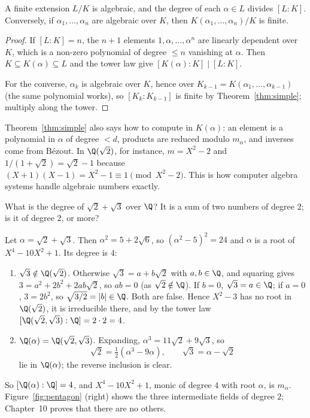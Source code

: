 \begin{corollary}\label{cor:finitealg}
A finite extension $L/K$ is algebraic, and the degree of each $\alpha\in L$ divides $[L:K]$. Conversely, if $\alpha_1,\dots,\alpha_n$ are algebraic over $K$, then $K(\alpha_1,\dots,\alpha_n)/K$ is finite.
\end{corollary}
\begin{proof}
If $[L:K]=n$, the $n+1$ elements $1,\alpha,\dots,\alpha^n$ are linearly dependent over $K$, which is a non-zero polynomial of degree $\le n$ vanishing at $\alpha$. Then $K\subseteq K(\alpha)\subseteq L$ and the tower law give $[K(\alpha):K]\mid[L:K]$.

For the converse, $\alpha_k$ is algebraic over $K$, hence over $K_{k-1}=K(\alpha_1,\dots,\alpha_{k-1})$ (the same polynomial works), so $[K_k:K_{k-1}]$ is finite by Theorem~\ref{thm:simple}; multiply along the tower.
\end{proof}

Theorem~\ref{thm:simple} also says how to compute in $K(\alpha)$: an element is a polynomial in $\alpha$ of degree $<d$, products are reduced modulo $m_\alpha$, and inverses come from Bézout. In $\Q(\sqrt2)$, for instance, $m=X^2-2$ and $1/(1+\sqrt2)=\sqrt2-1$ because $(X+1)(X-1)=X^2-1\equiv1\pmod{X^2-2}$. This is how computer algebra systems handle algebraic numbers exactly.

\begin{think}
What is the degree of $\sqrt2+\sqrt3$ over $\Q$? It is a sum of two numbers of degree $2$; is it of degree $2$, or more?
\end{think}

\begin{example}\label{ex:sqrt2sqrt3}
Let $\alpha=\sqrt2+\sqrt3$. Then $\alpha^2=5+2\sqrt6$, so $(\alpha^2-5)^2=24$ and $\alpha$ is a root of $X^4-10X^2+1$. Its degree is $4$:
\begin{enumerate}[label=(\arabic*)]
\item $\sqrt3\notin\Q(\sqrt2)$. Otherwise $\sqrt3=a+b\sqrt2$ with $a,b\in\Q$, and squaring gives $3=a^2+2b^2+2ab\sqrt2$, so $ab=0$ (as $\sqrt2\notin\Q$). If $b=0$, $\sqrt3=a\in\Q$; if $a=0$, $3=2b^2$, so $\sqrt{3/2}=|b|\in\Q$. Both are false. Hence $X^2-3$ has no root in $\Q(\sqrt2)$, it is irreducible there, and by the tower law $[\Q(\sqrt2,\sqrt3):\Q]=2\cdot2=4$.
\item $\Q(\alpha)=\Q(\sqrt2,\sqrt3)$. Expanding, $\alpha^3=11\sqrt2+9\sqrt3$, so
\[
\sqrt2=\tfrac12(\alpha^3-9\alpha),\qquad\sqrt3=\alpha-\sqrt2
\]
lie in $\Q(\alpha)$; the reverse inclusion is clear.
\end{enumerate}
So $[\Q(\alpha):\Q]=4$, and $X^4-10X^2+1$, monic of degree $4$ with root $\alpha$, is $m_\alpha$. Figure~\ref{fig:pentagon} (right) shows the three intermediate fields of degree $2$; Chapter~10 proves that there are no others.
\end{example}


